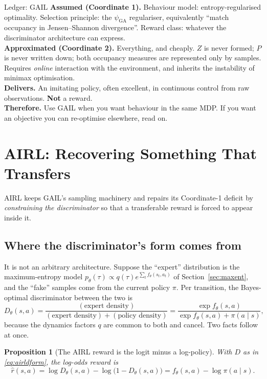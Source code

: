 \documentclass[11pt]{article}
\theoremstyle{plain}
\newtheorem{proposition}[theorem]{Proposition}
\theoremstyle{definition}
\theoremstyle{remark}
\newcommand{\GA}{\mathrm{GA}}
\begin{document}
\begin{navybox}{Ledger: GAIL}
\textbf{Assumed (Coordinate 1).} Behaviour model: entropy-regularised
optimality. Selection principle: the $\psi_\GA$ regulariser, equivalently
``match occupancy in Jensen--Shannon divergence''. Reward class: whatever
the discriminator architecture can express.\\
\textbf{Approximated (Coordinate 2).} Everything, and cheaply. $Z$ is
never formed; $P$ is never written down; both occupancy measures are
represented only by samples. Requires \emph{online} interaction with the
environment, and inherits the instability of minimax optimisation.\\
\textbf{Delivers.} An imitating policy, often excellent, in continuous
control from raw observations. \textbf{Not} a reward.\\
\textbf{Therefore.} Use GAIL when you want behaviour in the same MDP. If
you want an objective you can re-optimise elsewhere, read on.
\end{navybox}

\section{AIRL: Recovering Something That Transfers}
\label{sec:airl}

AIRL \cite{fu2018} keeps GAIL's sampling machinery and repairs its
Coordinate-1 deficit by \emph{constraining the discriminator} so that a
transferable reward is forced to appear inside it.

\subsection{Where the discriminator's form comes from}

It is not an arbitrary architecture. Suppose the ``expert'' distribution
is the maximum-entropy model $p_\theta(\tau)\propto
q(\tau)e^{\sum_t f_\theta(s_t,a_t)}$ of Section~\ref{sec:maxent}, and the
``fake'' samples come from the current policy $\pi$. Per transition, the
Bayes-optimal discriminator between the two is
\begin{equation}
D_\theta(s,a) = \frac{(\text{expert density})}{(\text{expert
density})+(\text{policy density})} = \frac{\exp f_\theta(s,a)}{\exp
f_\theta(s,a) + \pi(a\mid s)},
\label{eq:airldform}
\end{equation}
because the dynamics factors $q$ are common to both and cancel. Two facts
follow at once.

\begin{proposition}[The AIRL reward is the logit minus a
log-policy]\label{prop:airllogit}
With $D$ as in \eqref{eq:airldform}, the log-odds reward is
\begin{equation}
\hat r(s,a) = \log D_\theta(s,a) - \log\big(1-D_\theta(s,a)\big) =
f_\theta(s,a) - \log\pi(a\mid s).
\label{eq:airlreward}
\end{equation}
\end{proposition}
\end{document}
